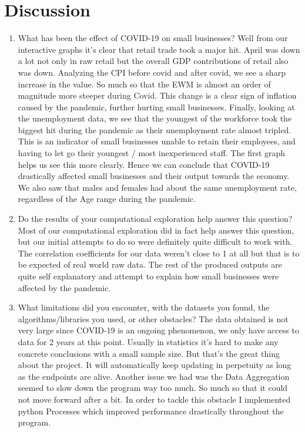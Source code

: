 \documentclass[fontsize=11pt]{article}
\begin{document}
    \section*{Discussion}
    \begin{enumerate}
        \item What has been the effect of COVID-19 on small businesses?
        Well from our interactive graphs it's clear that retail trade took a major hit. April was down a lot not only in raw retail but the overall GDP contributions of retail also was down. Analyzing the CPI before covid and after covid, we see a sharp increase in the value. So much so that the EWM is almost an order of magnitude more steeper during Covid. This change is a clear sign of inflation caused by the pandemic, further hurting small businesses. Finally, looking at the unemployment data, we see that the youngest of the workforce took the biggest hit during the pandemic as their unemployment rate almost tripled. This is an indicator of small businesses unable to retain their employees, and having to let go their youngest / most inexperienced staff. The first graph helps us see this more clearly. Hence we can conclude that COVID-19 drastically affected small businesses and their output towards the economy. We also saw that males and females had about the same unemployment rate, regardless of the Age range during the pandemic.
        \item Do the results of your computational exploration help answer this question? Most of our computational exploration did in fact help answer this question, but our initial attempts to do so were definitely quite difficult to work with. The correlation coefficients for our data weren't close to 1 at all but that is to be expected of real world raw data. The rest of the produced outputs are quite self explanatory and attempt to explain how small businesses were affected by the pandemic.
        \item What limitations did you encounter, with the datasets you found, the algorithms/libraries you used, or other obstacles?
        The data obtained is not very large since COVID-19 is an ongoing phenomenon, we only have access to data for 2 years at this point. Usually in statistics it's hard to make any concrete conclusions with a small sample size. But that's the great thing about the project. It will automatically keep updating in perpetuity as long as the endpoints are alive. Another issue we had was the Data Aggregation seemed to slow down the program way too much. So much so that it could not move forward after a bit. In order to tackle this obstacle I implemented python Processes which improved performance drastically throughout the program.

\end{enumerate}
\end{document}
